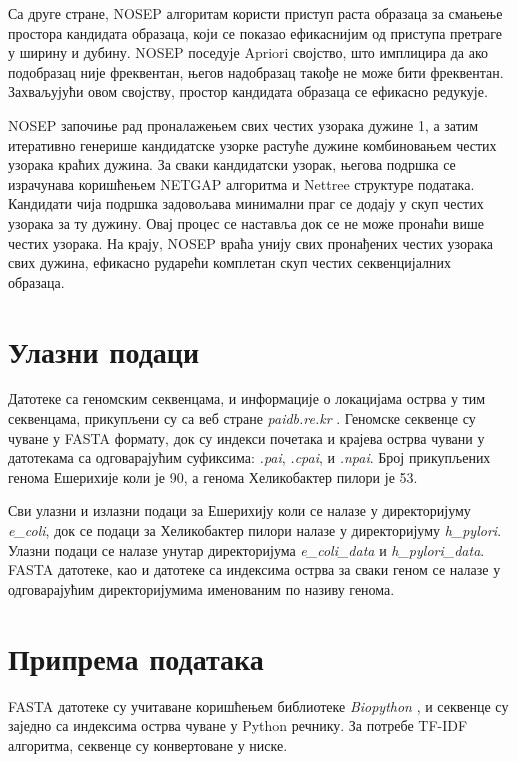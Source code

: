 \documentclass[12pt]{article}
\begin{document}
Са друге стране, NOSEP алгоритам користи приступ раста образаца за смањење простора кандидата образаца, који се показао ефикаснијим од приступа претраге у ширину и дубину. NOSEP поседује Apriori својство, што имплицира да ако подобразац није фреквентан, његов надобразац такође не може бити фреквентан. Захваљујући овом својству, простор кандидата образаца се ефикасно редукује.

NOSEP започиње рад проналажењем свих честих узорака дужине 1, а затим итеративно генерише кандидатске узорке растуће дужине комбиновањем честих узорака краћих дужина. За сваки кандидатски узорак, његова подршка се израчунава коришћењем NETGAP алгоритма и Nettree структуре података. Кандидати чија подршка задовољава минимални праг се додају у скуп честих узорака за ту дужину. Овај процес се наставља док се не може пронаћи више честих узорака. На крају, NOSEP враћа унију свих пронађених честих узорака свих дужина, ефикасно рударећи комплетан скуп честих секвенцијалних образаца.

\section{Улазни подаци}

Датотеке са геномским секвенцама, и информације о локацијама острва у тим секвенцама, прикупљени су са веб стране \textit{paidb.re.kr} \cite{Yoon2014-xa}. Геномске секвенце су чуване у FASTA формату, док су индекси почетака и крајева острва чувани у датотекама са одговарајућим суфиксима: \textit{.pai}, \textit{.cpai}, и \textit{.npai}. Број прикупљених генома Ешерихије коли је 90, а генома Хеликобактер пилори је 53.

Сви улазни и излазни подаци за Ешерихију коли се налазе у директоријуму \textit{e\_coli}, док се подаци за Хеликобактер пилори налазе у директоријуму \textit{h\_pylori}. Улазни подаци се налазе унутар директоријума \textit{e\_coli\_data} и \textit{h\_pylori\_data}. FASTA датотеке, као и датотеке са индексима острва за сваки геном се налазе у одговарајућим директоријумима именованим по називу генома. 

\section{Припрема података}

FASTA датотеке су учитаване коришћењем библиотеке \textit{Biopython} \cite{cock2009biopython}, и секвенце су заједно са индексима острва чуване у Python речнику. За потребе TF-IDF алгоритма, секвенце су конвертоване у ниске. \\
\end{document}
